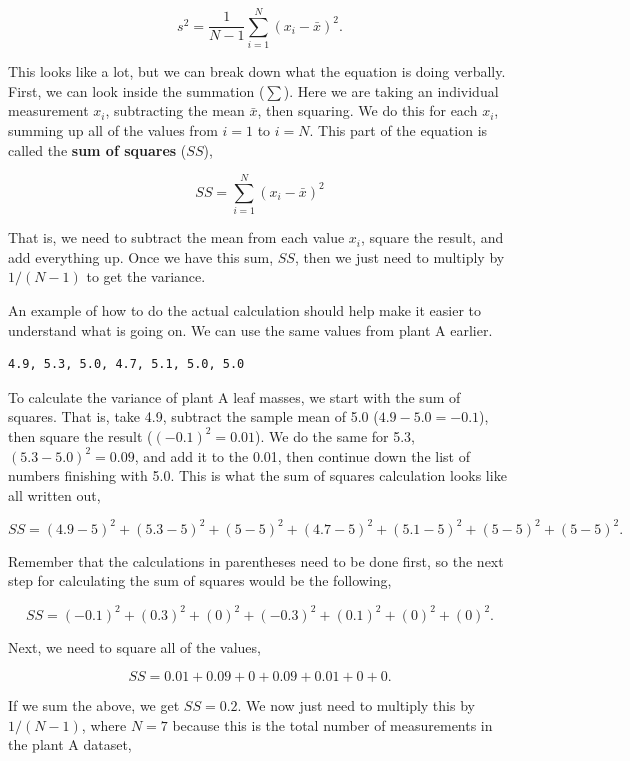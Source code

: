 \documentclass[
]{scrbook}
\begin{document}
\[s^{2} = \frac{1}{N - 1}\sum_{i = 1}^{N}\left(x_{i} - \bar{x} \right)^{2}.\]

This looks like a lot, but we can break down what the equation is doing verbally.
First, we can look inside the summation (\(\sum\)).
Here we are taking an individual measurement \(x_{i}\), subtracting the mean \(\bar{x}\), then squaring.
We do this for each \(x_{i}\), summing up all of the values from \(i = 1\) to \(i = N\).
This part of the equation is called the \textbf{sum of squares} (\(SS\)),

\[SS = \sum_{i = 1}^{N}\left(x_{i} - \bar{x} \right)^{2}\]

That is, we need to subtract the mean from each value \(x_{i}\), square the result, and add everything up.
Once we have this sum, \(SS\), then we just need to multiply by \(1 / (N - 1)\) to get the variance.

An example of how to do the actual calculation should help make it easier to understand what is going on.
We can use the same values from plant A earlier.

\begin{verbatim}
4.9, 5.3, 5.0, 4.7, 5.1, 5.0, 5.0
\end{verbatim}

To calculate the variance of plant A leaf masses, we start with the sum of squares.
That is, take 4.9, subtract the sample mean of 5.0 (\(4.9 - 5.0 = -0.1\)), then square the result (\((-0.1)^{2} = 0.01\)).
We do the same for 5.3, \((5.3 - 5.0)^{2} = 0.09\), and add it to the 0.01, then continue down the list of numbers finishing with 5.0.
This is what the sum of squares calculation looks like all written out,

\[SS = (4.9 - 5)^{2} + (5.3 - 5)^{2} + (5 - 5)^{2} + (4.7 - 5)^{2} + (5.1 - 5)^{2} + (5 - 5)^{2} + (5 - 5)^{2}.\]

Remember that the calculations in parentheses need to be done first, so the next step for calculating the sum of squares would be the following,

\[SS = (-0.1)^{2} + (0.3)^{2} + (0)^{2} + (-0.3)^{2} + (0.1)^{2} + (0)^{2} + (0)^{2}.\]

Next, we need to square all of the values,

\[SS = 0.01 + 0.09 + 0 + 0.09 + 0.01 + 0 + 0.\]

If we sum the above, we get \(SS = 0.2\).
We now just need to multiply this by \(1 / (N - 1)\), where \(N = 7\) because this is the total number of measurements in the plant A dataset,
\end{document}
